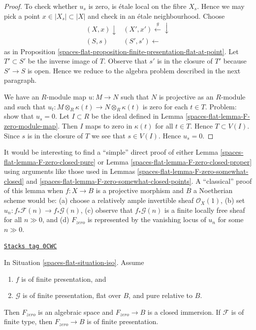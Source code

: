 \begin{proof}
To check whether $u_s$ is zero, is \'etale local on the fibre $X_s$.
Hence we may pick a point $x \in |X_s| \subset |X|$ and check
in an \'etale neighbourhood. Choose
$$
\begin{array}{cc}(X, x) \downarrow & (X', x') \overset{g}{\longleftarrow}\downarrow \\ (S, s) & (S', s') \longleftarrow\end{array}
$$
as in Proposition \ref{spaces-flat-proposition-finite-presentation-flat-at-point}.
Let $T' \subset S'$ be the inverse image of $T$. Observe that
$s'$ is in the closure of $T'$ because $S' \to S$ is open.
Hence we reduce to the algebra problem described in the
next paragraph.

\medskip\noindent
We have an $R$-module map $u : M \to N$ such that $N$ is projective
as an $R$-module and such that
$u_t : M \otimes_R \kappa(t) \to N \otimes_R \kappa(t)$
is zero for each $t \in T$. Problem: show that $u_s = 0$.
Let $I \subset R$ be the ideal defined in Lemma \ref{spaces-flat-lemma-F-zero-module-map}.
Then $I$ maps to zero in $\kappa(t)$ for all $t \in T$.
Hence $T \subset V(I)$. Since $s$ is in the closure of $T$
we see that $s \in V(I)$. Hence $u_s = 0$.
\end{proof}

It would be interesting to find a ``simple'' direct proof of either
Lemma \ref{spaces-flat-lemma-F-zero-closed-pure} or
Lemma \ref{spaces-flat-lemma-F-zero-closed-proper}
using arguments like those used in
Lemmas \ref{spaces-flat-lemma-F-zero-somewhat-closed} and
\ref{spaces-flat-lemma-F-zero-somewhat-closed-points}.
A ``classical'' proof of this lemma when $f : X \to B$ is a projective
morphism and $B$ a Noetherian scheme would be: (a) choose a relatively ample
invertible sheaf $\mathcal{O}_X(1)$, (b) set
$u_n : f_*\mathcal{F}(n) \to f_*\mathcal{G}(n)$,
(c) observe that $f_*\mathcal{G}(n)$ is a finite locally free sheaf
for all $n \gg 0$, and (d) $F_{zero}$ is represented by the vanishing
locus of $u_n$ for some $n \gg 0$.

\begin{lemma}
\label{spaces-flat-lemma-F-zero-closed-pure}
\href{https://stacks.math.columbia.edu/tag/0CWC}{\texttt{Stacks tag 0CWC}}

In Situation \ref{spaces-flat-situation-iso}. Assume
\begin{enumerate}
\item $f$ is of finite presentation, and
\item $\mathcal{G}$ is of finite presentation,
flat over $B$, and pure relative to $B$.
\end{enumerate}
Then $F_{zero}$ is an algebraic space and $F_{zero} \to B$
is a closed immersion. If $\mathcal{F}$ is of finite type, then
$F_{zero} \to B$ is of finite presentation.
\end{lemma}

